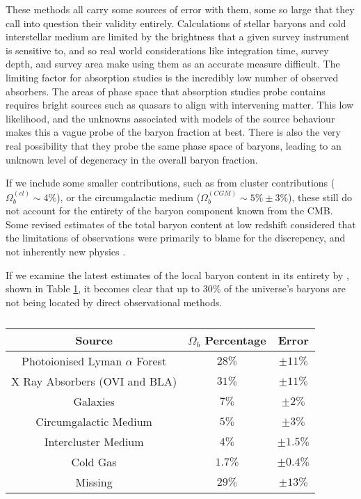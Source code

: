 These methods all carry some sources of error with them, some so large that they call into question their validity entirely. Calculations of stellar baryons and cold interstellar medium are limited by the brightness that a given survey instrument is sensitive to, and so real world considerations like integration time, survey depth, and survey area make using them as an accurate measure difficult. The limiting factor for absorption studies is the incredibly low number of observed absorbers. The areas of phase space that absorption studies probe contains requires bright sources such as quasars to align with intervening matter. This low likelihood, and the unknowns associated with models of the source behaviour makes this a vague probe of the baryon fraction at best. There is also the very real possibility that they probe the same phase space of baryons, leading to an unknown level of degeneracy in the overall baryon fraction. 

\par If we include some smaller contributions, such as from cluster contributions ($\Omega_b^{(cl)} \sim 4 \%$)\citep{2004ApJ...616..643F}, or the circumgalactic medium ($\Omega_b^{(CGM)} \sim 5 \% \pm 3\%$), these still do not account for the entirety of the baryon component known from the CMB. Some revised estimates of the total baryon content at low redshift considered that the limitations of observations were primarily to blame for the discrepency, and not inherently new physics \citep{1994MNRAS.267...13B, 1998ApJ...503..518F}.

\par If we examine the latest estimates of the local baryon content in its entirety by \cite{2012ApJ...759...23S}, shown in Table \ref{table:baryon_census}, it becomes clear that up to $30 \%$ of the universe's baryons are not being located by direct observational methods.

\begin{table}[h!]
\centering
\begin{tabular}{||c c c||} 
 \hline
 Source & $\Omega_b$ Percentage & Error \\
 \hline\hline
 Photoionised Lyman $\alpha$ Forest & $28\%$ & $\pm 11 \%$ \\
 \hline
 X Ray Absorbers (OVI and BLA) & $31\%$ & $\pm 11 \%$ \\
 \hline
 Galaxies & $7\%$ & $\pm 2\%$ \\
 \hline
 Circumgalactic Medium  & $5\%$ & $\pm 3 \%$  \\
 \hline
 Intercluster Medium  & $4\%$ & $\pm 1.5 \%$ \\
 \hline
 Cold Gas  & $1.7\%$ & $\pm 0.4 \%$ \\
 \hline \hline
 Missing & $29 \% $ & $\pm 13\%$ \\
 \hline
\end{tabular}
\caption{}
\label{table:baryon_census}
\end{table}


